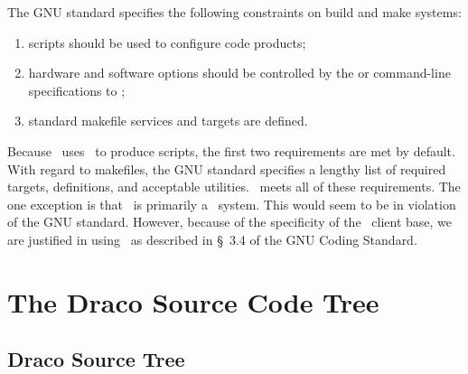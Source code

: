 The GNU standard specifies the following constraints on build and make 
systems:
\begin{enumerate}
\item {} scripts should be used to configure code
  products;
\item hardware and software options should be controlled by the
   or 
  command-line specifications to ;
\item standard makefile services and targets are defined.
\end{enumerate}
Because \draco\ uses \autoconf\ to produce  scripts,
the first two requirements are met by default.  With regard to
makefiles, the GNU standard specifies a lengthy list of required
targets, definitions, and acceptable utilities.  \draco\ meets all of
these requirements.  The one exception is that \draco\ is primarily a
\cpp\ system.  This would seem to be in violation of the GNU standard.
However, because of the specificity of the \draco\ client base, we are
justified in using \cpp\ as described in \S~3.4 of the GNU Coding
Standard.


\section{The Draco Source Code Tree}
\label{sec:draco_src_tree}

\subsection{Draco Source Tree}

